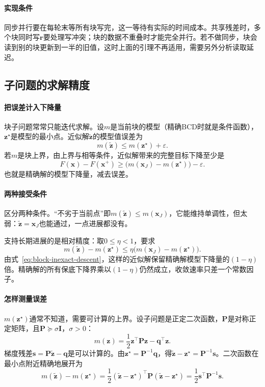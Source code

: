 \paragraph{实现条件}
同步并行要在每轮末等所有块写完，这一等待有实际的时间成本。共享残差时，多个块同时写$\bm{r}$要处理写冲突；块的数据不重叠时才能完全并行。若不做同步，块会读到别的块更新到一半的旧值，这时上面的引理不再适用，需要另外分析读取延迟。

\subsection{子问题的求解精度}
\label{sec:block-inexact}

\paragraph{把误差计入下降量}
块子问题常常只能迭代求解。设$m$是当前块的模型（精确BCD时就是条件函数），$\bm{z}^\star$是模型的最小点。近似解$\tilde{\bm{z}}$的模型值误差为
\begin{equation}
 m(\tilde{\bm{z}})\leq m(\bm{z}^\star)+\varepsilon .
 \label{eq:block-inexact}
\end{equation}
若$m$是块上界，由上界与相等条件，近似解带来的完整目标下降至少是
\begin{equation}
 F(\bm{x})-F(\bm{x}^{+})\geq\bigl(m(\bm{x}_J)-m(\bm{z}^\star)\bigr)-\varepsilon .
 \label{eq:block-inexact-descent}
\end{equation}
也就是精确解的模型下降量，减去误差。

\paragraph{两种接受条件}
区分两种条件。“不劣于当前点”即$m(\tilde{\bm{z}})\leq m(\bm{x}_J)$，它能维持单调性，但太弱：$\tilde{\bm{z}}=\bm{x}_J$也能通过，一点进展都没有。

支持长期进展的是相对精度：取$0\leq\eta<1$，要求
\begin{equation}
 m(\tilde{\bm{z}})-m(\bm{z}^\star)\leq\eta\bigl(m(\bm{x}_J)-m(\bm{z}^\star)\bigr).
 \label{eq:block-relative-accuracy}
\end{equation}
由式~\eqref{eq:block-inexact-descent}，这样的近似解保留精确解模型下降量的$(1-\eta)$倍。精确解的所有保底下降界乘以$(1-\eta)$仍然成立，收敛速率只差一个常数因子。

\paragraph{怎样测量误差}
$m(\bm{z}^\star)$通常不知道，需要可计算的上界。设子问题是正定二次函数，$\bm{P}$是对称正定矩阵，且$\bm{P}\succeq\sigma\bm{I}$，$\sigma>0$：
\[
 m(\bm{z})=\frac12\bm{z}^\top\bm{P}\bm{z}-\bm{q}^\top\bm{z}.
\]
梯度残差$\bm{s}=\bm{P}\tilde{\bm{z}}-\bm{q}$是可以计算的。由$\bm{z}^\star=\bm{P}^{-1}\bm{q}$，得$\tilde{\bm{z}}-\bm{z}^\star=\bm{P}^{-1}\bm{s}$。二次函数在最小点附近精确地展开为
\[
 m(\tilde{\bm{z}})-m(\bm{z}^\star)=\frac12(\tilde{\bm{z}}-\bm{z}^\star)^\top\bm{P}(\tilde{\bm{z}}-\bm{z}^\star)=\frac12\bm{s}^\top\bm{P}^{-1}\bm{s}.
\]

